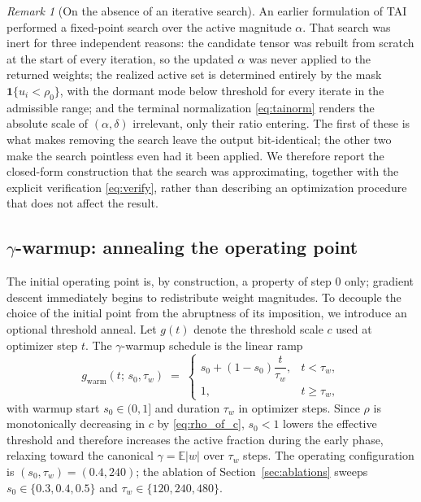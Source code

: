 \documentclass[final,5p,times,twocolumn]{elsarticle}
\theoremstyle{remark}
\newtheorem{remark}{Remark}
\newcommand{\E}{\mathbb{E}}
\newcommand{\rhoz}{\rho_{0}}
\begin{document}
\begin{remark}[On the absence of an iterative search]
\label{rem:noloop}
An earlier formulation of TAI performed a fixed-point search over the active
magnitude $\alpha$. That search was inert for three independent reasons: the
candidate tensor was rebuilt from scratch at the start of every iteration, so
the updated $\alpha$ was never applied to the returned weights; the realized
active set is determined entirely by the mask $\mathbf{1}\{u_i<\rhoz\}$, with
the dormant mode below threshold for every iterate in the admissible range;
and the terminal normalization \eqref{eq:tainorm} renders the absolute scale
of $(\alpha,\delta)$ irrelevant, only their ratio entering. The first of these
is what makes removing the search leave the output bit-identical; the other
two make the search pointless even had it been applied. We therefore report the closed-form
construction that the search was approximating, together with the explicit
verification \eqref{eq:verify}, rather than describing an optimization
procedure that does not affect the result.
\end{remark}

\subsection{$\gamma$-warmup: annealing the operating point}
\label{sec:warmup}

The initial operating point is, by construction, a property of step $0$ only;
gradient descent immediately begins to redistribute weight magnitudes. To
decouple the choice of the initial point from the abruptness of its imposition,
we introduce an optional threshold anneal. Let $g(t)$ denote the threshold scale
$c$ used at optimizer step $t$. The $\gamma$-warmup schedule is the linear ramp
\begin{equation}
\label{eq:gammawarmup}
g_{\mathrm{warm}}(t;\,s_{0},\tau_{w}) \;=\;
\begin{cases}
s_{0} + (1-s_{0})\dfrac{t}{\tau_{w}}, & t < \tau_{w},\\[2ex]
1, & t \geq \tau_{w},
\end{cases}
\end{equation}
with warmup start $s_{0} \in (0,1]$ and duration $\tau_{w}$ in optimizer steps.
Since $\rho$ is monotonically decreasing in $c$ by \eqref{eq:rho_of_c},
$s_{0} < 1$ lowers the effective threshold and therefore increases the
active fraction during the early phase, relaxing toward the canonical
$\gamma = \E|w|$ over $\tau_{w}$ steps. The operating configuration is
$(s_{0},\tau_{w}) = (0.4, 240)$; the ablation of Section~\ref{sec:ablations}
sweeps $s_{0} \in \{0.3,0.4,0.5\}$ and $\tau_{w} \in \{120,240,480\}$.
\end{document}
